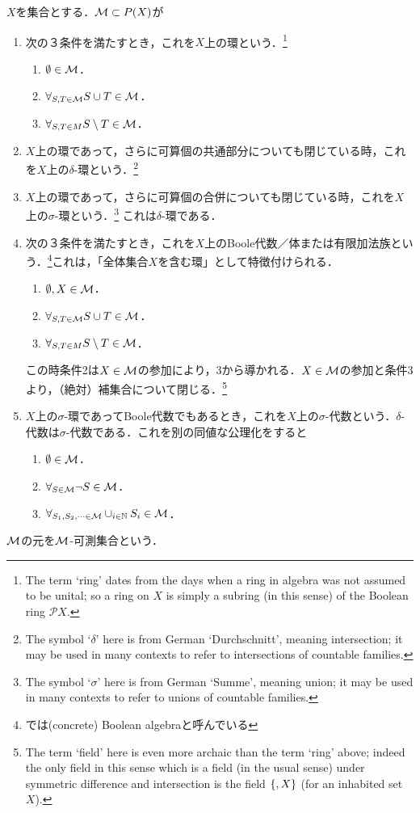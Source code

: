 \documentclass[uplatex, dvipdfmx]{jsreport}
\begin{document}
\begin{definition}\label{def-sigma-algebra}
    $X$を集合とする．$\mathcal{M}\subset P(X)$が
    \begin{enumerate}
        \item 次の３条件を満たすとき，これを$X$上の環という．\footnote{The term ‘ring’ dates from the days when a ring in algebra was not assumed to be unital; so a ring on $X$ is simply a subring (in this sense) of the Boolean ring $\mathcal{P} X$.}
        \begin{enumerate}[1]
            \item $\emptyset\in\mathcal{M}$．
            \item $\forall_{S,T\in\mathcal{M}}S\cup T\in\mathcal{M}$．
            \item $\forall_{S,T\in M}S\setminus T\in\mathcal{M}$．
        \end{enumerate}
        \item $X$上の環であって，さらに可算個の共通部分についても閉じている時，これを$X$上の$\delta$-環という．\footnote{The symbol ‘$\delta$’ here is from German ‘Durchschnitt’, meaning intersection; it may be used in many contexts to refer to intersections of countable families.}
        \item $X$上の環であって，さらに可算個の合併についても閉じている時，これを$X$上の$\sigma$-環という．\footnote{The symbol ‘$\sigma$’ here is from German ‘Summe’, meaning union; it may be used in many contexts to refer to unions of countable families.}
        これは$\delta$-環である．
        \item 次の３条件を満たすとき，これを$X$上のBoole代数／体または有限加法族という．\footnote{\cite{Tao}では(concrete) Boolean algebraと呼んでいる}これは，「全体集合$X$を含む環」として特徴付けられる．
        \begin{enumerate}[1]
            \item $\emptyset,X\in\mathcal{M}$．
            \item $\forall_{S,T\in\mathcal{M}}S\cup T\in\mathcal{M}$．
            \item $\forall_{S,T\in M}S\setminus T\in\mathcal{M}$．
        \end{enumerate}
        この時条件2は$X\in\mathcal{M}$の参加により，3から導かれる．$X\in\mathcal{M}$の参加と条件3より，（絶対）補集合について閉じる．\footnote{The term ‘field’ here is even more archaic than the term ‘ring’ above; indeed the only field in this sense which is a field (in the usual sense) under symmetric difference and intersection is the field $\{\empty, X\}$ (for an inhabited set $X$).}
        \item $X$上の$\sigma$-環であってBoole代数でもあるとき，これを$X$上の$\sigma$-代数という．$\delta$-代数は$\sigma$-代数である．これを別の同値な公理化をすると
        \begin{enumerate}[1]
            \item $\emptyset\in\mathcal{M}$．
            \item $\forall_{S\in\mathcal{M}}\lnot S\in\mathcal{M}$．
            \item $\forall_{S_1,S_2,\cdots\in\mathcal{M}}\cup_{i\in\mathbb{N}}S_i\in\mathcal{M}$．
        \end{enumerate}
    \end{enumerate}
    $\mathcal{M}$の元を$\mathcal{M}$-可測集合という．
\end{definition}
\end{document}

